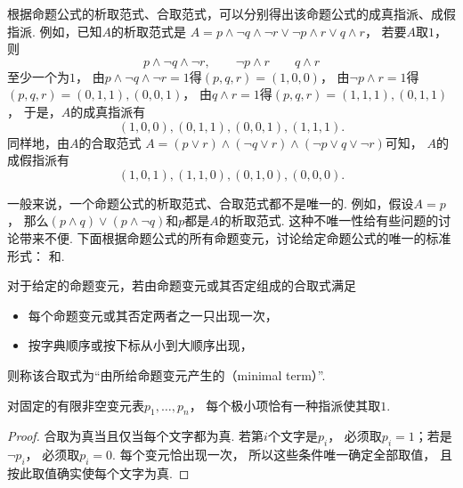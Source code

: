 根据命题公式的析取范式、合取范式，可以分别得出该命题公式的成真指派、成假指派.
例如，已知\(A\)的析取范式是
\(A = p \land \neg q \land \neg r
\lor \neg p \land r
\lor q \land r\)，
若要\(A\)取\(1\)，
则\begin{equation*}
	p \land \neg q \land \neg r,
	\qquad
	\neg p \land r
	\qquad
	q \land r
\end{equation*}至少一个为\(1\)，
由\(p \land \neg q \land \neg r = 1\)得\((p,q,r) = (1,0,0)\)，
由\(\neg p \land r = 1\)得\((p,q,r) = (0,1,1),(0,0,1)\)，
由\(q \land r = 1\)得\((p,q,r) = (1,1,1),(0,1,1)\)，
于是，\(A\)的成真指派有\begin{equation*}
	(1,0,0),
	(0,1,1),
	(0,0,1),
	(1,1,1).
\end{equation*}
同样地，由\(A\)的合取范式
\(A = (p \lor r) \land (\neg q \lor r) \land (\neg p \lor q \lor \neg r)\)可知，
\(A\)的成假指派有\begin{equation*}
	(1,0,1),
	(1,1,0),
	(0,1,0),
	(0,0,0).
\end{equation*}

一般来说，一个命题公式的析取范式、合取范式都不是唯一的.
例如，假设\(A = p\)，
那么\((p \land q) \lor (p \land \neg q)\)和\(p\)都是\(A\)的析取范式.
这种不唯一性给有些问题的讨论带来不便.
下面根据命题公式的所有命题变元，讨论给定命题公式的唯一的标准形式：
和.

\begin{definition}
对于给定的命题变元，若由命题变元或其否定组成的合取式满足\begin{itemize}
	\item 每个命题变元或其否定两者之一只出现一次，
	\item 按字典顺序或按下标从小到大顺序出现，
\end{itemize}
则称该合取式为“由所给命题变元产生的（minimal term）”.
\end{definition}

\begin{proposition}
    对固定的有限非空变元表\(p_1,\dotsc,p_n\)，
    每个极小项恰有一种指派使其取\(1\).
    \begin{proof}
        合取为真当且仅当每个文字都为真.
        若第\(i\)个文字是\(p_i\)，
        必须取\(p_i=1\)；若是\(\neg p_i\)，
        必须取\(p_i=0\).
        每个变元恰出现一次，
        所以这些条件唯一确定全部取值，
        且按此取值确实使每个文字为真.
    \end{proof}
\end{proposition}

